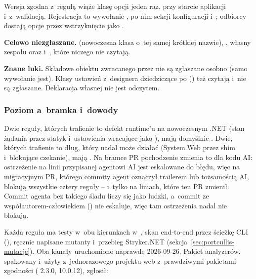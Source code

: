 Wersja zgodna z~regułą wiąże klasę opcji jeden raz, przy starcie aplikacji i~z~walidacją.
Rejestracja to wywołanie , po nim  sekcji
konfiguracji i~; odbiorcy dostają opcje przez wstrzyknięcie jako
.

\textbf{Celowo niezgłaszane.} 
(nowoczesna klasa o~tej samej krótkiej nazwie), , własny
 zespołu oraz 
i~, które niczego nie czytają.

\textbf{Znane luki.} Składowe obiektu  zwracanego przez
 nie są zgłaszane osobno (samo wywołanie jest). Klasy
ustawień z~designera dziedziczące po 
() też czytają  i~nie są
zgłaszane. Deklaracja własnej  nie jest odczytem.

\subsubsection{Poziom a~bramka i~dowody}

Dwie reguły, których trafienie to defekt runtime'u na nowoczesnym .NET (stan żądania przez
statyk i~ustawienia wracające jako ), mają domyślnie . Dwie,
których trafienie to dług, który nadal może działać (System.Web przez shim i~blokujące
czekanie), mają . Na bramce PR pochodzenie zmienia to dla kodu AI:
ostrzeżenie na linii przypisanej agentowi AI jest eskalowane do błędu, więc na migracyjnym
PR, którego commity agent oznaczył trailerem lub tożsamością AI, blokują wszystkie cztery
reguły -- i~tylko na liniach, które ten PR zmienił. Commit agenta bez takiego śladu liczy się
jako ludzki, a~commit ze współautorem-człowiekiem () nie eskaluje, więc tam
ostrzeżenia nadal nie blokują.


Każda reguła ma testy w~obu kierunkach w~,
skan end-to-end przez ścieżkę CLI (), ręcznie napisane
mutanty i~przebieg Stryker.NET (sekcja~\ref{sec:portcullis-mutacje}). Oba kanały
uruchomiono naprawdę 2026-09-26. Pakiet analyzerów, spakowany i~użyty z~jednorazowego
projektu web  z~prawdziwymi pakietami zgodności
( 2.3.0,
 10.0.12), zgłosił:

